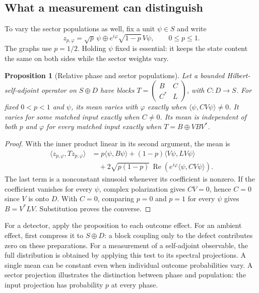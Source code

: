 \documentclass[11pt]{article}
\newtheorem{proposition}{Proposition}[section]
\theoremstyle{definition}
\begin{document}
\subsection{What a measurement can distinguish}

To vary the sector populations as well, fix a unit $\psi\in S$ and write
\[
 z_{p,\varphi}=\sqrt p\,\psi\oplus e^{i\varphi}\sqrt{1-p}\,V\psi,
 \qquad 0\leq p\leq1.
\]
The graphs use $p=1/2$. Holding $\psi$ fixed is essential: it keeps the state content the same on both sides while the sector weights vary.

\begin{proposition}[Relative phase and sector populations]
\label{prop:phase-readout}
Let a bounded Hilbert-self-adjoint operator on $S\oplus D$ have blocks
$T=\left(\begin{smallmatrix}B&C\\ C^*&L\end{smallmatrix}\right)$, with $C:D\to S$.
For fixed $0<p<1$ and $\psi$, its mean varies with $\varphi$ exactly when $\langle\psi,CV\psi\rangle\ne0$. It varies for some matched input exactly when $C\ne0$. Its mean is independent of \emph{both} $p$ and $\varphi$ for every matched input exactly when $T=B\oplus VBV^*$.
\end{proposition}
\begin{proof}
With the inner product linear in its second argument, the mean is
\begin{align*}
 \langle z_{p,\varphi},Tz_{p,\varphi}\rangle
 &=p\langle\psi,B\psi\rangle+(1-p)\langle V\psi,LV\psi\rangle\\
 &\quad+2\sqrt{p(1-p)}\,\operatorname{Re}\!\left(e^{i\varphi}\langle\psi,CV\psi\rangle\right).
\end{align*}
The last term is a nonconstant sinusoid whenever its coefficient is nonzero. If the coefficient vanishes for every $\psi$, complex polarization gives $CV=0$, hence $C=0$ since $V$ is onto $D$. With $C=0$, comparing $p=0$ and $p=1$ for every $\psi$ gives $B=V^*LV$. Substitution proves the converse.
\end{proof}

For a detector, apply the proposition to each outcome effect. For an ambient effect, first compress it to $S\oplus D$: a block coupling only to the defect contributes zero on these preparations. For a measurement of a self-adjoint observable, the full distribution is obtained by applying this test to its spectral projections. A single mean can be constant even when individual outcome probabilities vary. A sector projection illustrates the distinction between phase and population: the input projection has probability $p$ at every phase.
\end{document}
